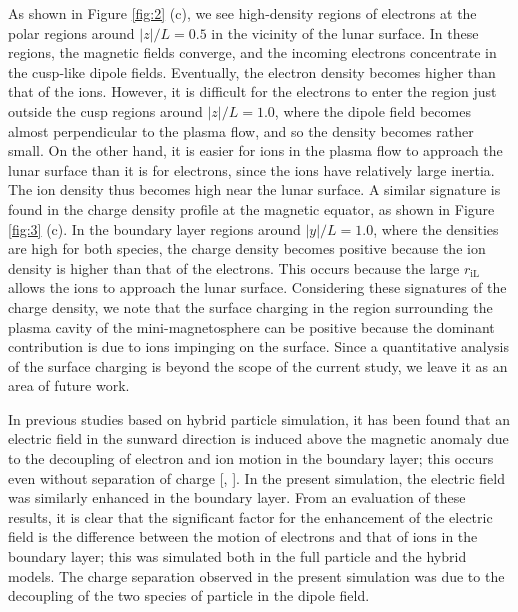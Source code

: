 \documentclass[draft,jgrga]{agutex2015}
\begin{document}
\begin{article}
As shown in Figure \ref{fig:2} (c),
we see high-density regions of electrons
at the polar regions around $|z|/L =0.5$ in
the vicinity of the lunar surface.
In these regions,
the magnetic fields converge, and the incoming electrons concentrate
in the cusp-like dipole fields.
Eventually, the electron density becomes higher than that of the ions.
However, it is difficult for the electrons to enter the region
just outside the cusp regions around $|z|/L = 1.0$,
where the dipole field becomes 
almost perpendicular to the plasma flow, 
and so
the density becomes rather small.  
On the other hand, it is easier for
ions in the plasma flow to approach the lunar surface
than it is for electrons, since the ions have relatively large inertia.
The ion density thus becomes high near the lunar surface.
A similar signature 
is found in the charge density profile at the magnetic equator, as shown in Figure \ref{fig:3} (c).
In the boundary layer regions around $|y|/L = 1.0$, where the densities are high 
for both species,
the charge density becomes positive 
because the ion density is higher than that of the electrons.
This occurs because the large $r_\mathrm{iL}$ allows the ions to approach the lunar surface.
Considering these signatures of the charge density, we note that 
the surface charging in the region surrounding the plasma cavity 
of the mini-magnetosphere can be positive
because the dominant contribution is due to ions impinging on the surface.
Since a quantitative analysis of the surface charging is 
beyond the scope of the current study, 
we leave it as an area of future work.

%
%


%
In previous studies based on hybrid particle simulation, it has been found that an
electric field in the sunward direction is induced above the magnetic anomaly 
due to the decoupling of electron and ion motion in the boundary layer; this occurs 
even without separation of charge [\cite{Jarvinen2014}, \cite{Fatemi2015}].
In the present simulation, 
the electric field was similarly enhanced in the boundary layer.
From an evaluation of these results, it is clear that
the significant factor for the enhancement of the electric field is
the difference between the motion of electrons and that of ions in the boundary layer;
this was simulated both in the full particle and the hybrid models.
The charge separation observed in the present simulation
was due to the decoupling of the two species of particle in the dipole field. 


\end{article}
\end{document}
